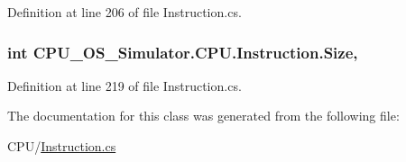 Definition at line 206 of file Instruction.\+cs.

\hypertarget{class_c_p_u___o_s___simulator_1_1_c_p_u_1_1_instruction_a7c60418808e7bd6cb1964a227dcd9dac}{}
\subsubsection[{Size}]{\setlength{\rightskip}{0pt plus 5cm}int C\+P\+U\+\_\+\+O\+S\+\_\+\+Simulator.\+C\+P\+U.\+Instruction.\+Size\hspace{0.3cm}{\ttfamily [get]}, {\ttfamily [set]}}\label{class_c_p_u___o_s___simulator_1_1_c_p_u_1_1_instruction_a7c60418808e7bd6cb1964a227dcd9dac}


Definition at line 219 of file Instruction.\+cs.



The documentation for this class was generated from the following file\+:\begin{DoxyCompactItemize}
\item 
C\+P\+U/\hyperlink{_instruction_8cs}{Instruction.\+cs}\end{DoxyCompactItemize}
